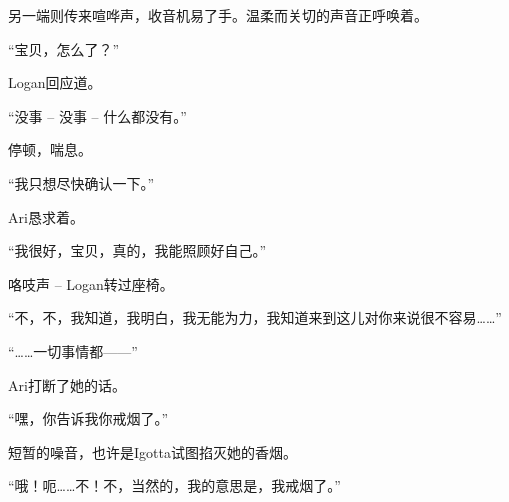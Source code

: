 \begin{scpbox}
另一端则传来喧哗声，收音机易了手。温柔而关切的声音正呼唤着。
\end{scpbox}

\begin{scpdialog}
“宝贝，怎么了？”
\end{scpdialog}

\begin{scpbox}
Logan回应道。
\end{scpbox}

\begin{scpdialog}
“没事 – 没事 – 什么都没有。”
\end{scpdialog}

\begin{scpdialog}
停顿，喘息。
\end{scpdialog}

\begin{scpdialog}
“我只想尽快确认一下。”
\end{scpdialog}

\begin{scpbox}
Ari恳求着。
\end{scpbox}

\begin{scpdialog}
“我很好，宝贝，真的，我能照顾好自己。”
\end{scpdialog}

\begin{scpbox}
咯吱声 – Logan转过座椅。
\end{scpbox}

\begin{scpdialog}
“不，不，我知道，我明白，我无能为力，我知道来到这儿对你来说很不容易……”
\end{scpdialog}

\begin{scpdialog}
“……一切事情都——”
\end{scpdialog}

\begin{scpbox}
Ari打断了她的话。
\end{scpbox}

\begin{scpdialog}
“嘿，你告诉我你戒烟了。”
\end{scpdialog}

\begin{scpbox}
短暂的噪音，也许是Igotta试图掐灭她的香烟。
\end{scpbox}

\begin{scpdialog}
“哦！呃……不！不，当然的，我的意思是，我戒烟了。”
\end{scpdialog}

